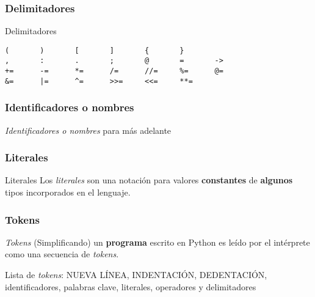 \documentclass{beamer}
\begin{document}
\begin{frame}[fragile]
\frametitle{Delimitadores}
\begin{block}{{Delimitadores}}
\begin{verbatim}
(       )       [       ]       {       }
,       :       .       ;       @       =       ->
+=      -=      *=      /=      //=     %=      @=
&=      |=      ^=      >>=     <<=     **=
\end{verbatim}
\end{block}
\end{frame}

\begin{frame}[fragile]
\frametitle{Identificadores o nombres}
\begin{block}{{\em Identificadores o nombres}}
\alert{para más adelante}
\end{block}
\end{frame}

\begin{frame}[fragile]
\frametitle{Literales}
\begin{block}{Literales}
Los {\em literales} son una notación para valores {\bf constantes} de {\bf algunos} tipos incorporados en el lenguaje.
\end{block}
\end{frame}

\begin{frame}
\frametitle{Tokens}
\begin{block}{{\em Tokens}}
(Simplificando) un {\bf programa} escrito en Python es leído por el intérprete como una secuencia de {\em tokens}.
\end{block}
\begin{block}{Lista de {\em tokens}:}
NUEVA LÍNEA, INDENTACIÓN, DEDENTACIÓN, identificadores, palabras clave, literales, operadores y delimitadores
\end{block}
\end{frame}
\end{document}
